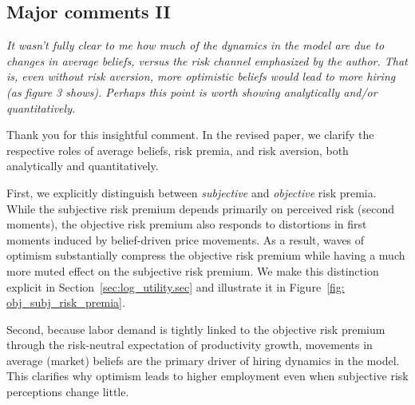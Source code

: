 \documentclass[12pt,a4paper]{article}
\newcommand{\commentbox}[1]{
\begin{mdframed}[style=commentbox] 
		\textit{#1}
\end{mdframed}}
\begin{document}




\subsection*{Major comments II}

\commentbox{
	It wasn't fully clear to me how much of the dynamics in the model are due to
	changes in average beliefs, versus the risk channel emphasized by the author.
	That is, even without risk aversion, more optimistic beliefs would lead to more
	hiring (as figure 3 shows). Perhaps this point is worth showing analytically and/or
	quantitatively.
}

Thank you for this insightful comment. In the revised paper, we clarify the respective
roles of average beliefs, risk premia, and risk aversion, both analytically and
quantitatively.

First, we explicitly distinguish between \emph{subjective} and \emph{objective} risk
premia. While the subjective risk premium depends primarily on perceived risk (second
moments), the objective risk premium also responds to distortions in first moments induced
by belief-driven price movements. As a result, waves of optimism substantially compress
the objective risk premium while having a much more muted effect on the subjective risk
premium. We make this distinction explicit in Section~\ref{sec:log_utility.sec} and
illustrate it in Figure~\ref{fig: obj_subj_risk_premia}.

Second, because labor demand is tightly linked to the objective risk premium through the
risk-neutral expectation of productivity growth, movements in average (market) beliefs
are the primary driver of hiring dynamics in the model. This clarifies why optimism leads
to higher employment even when subjective risk perceptions change little.
\end{document}

